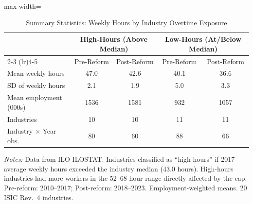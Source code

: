 \begin{table}[t]
\centering
\caption{Summary Statistics: Weekly Hours by Industry Overtime Exposure}
\label{tab:summary}
\begin{adjustbox}{max width=\textwidth}
\begin{tabular}{lcccc}
\hline\hline
 & \multicolumn{2}{c}{High-Hours (Above Median)} & \multicolumn{2}{c}{Low-Hours (At/Below Median)} \\
\cmidrule(lr){2-3} \cmidrule(lr){4-5}
 & Pre-Reform & Post-Reform & Pre-Reform & Post-Reform \\
\hline
Mean weekly hours & 47.0 & 42.6 & 40.1 & 36.6 \\
SD of weekly hours & 2.1 & 1.9 & 5.0 & 3.3 \\
Mean employment (000s) & 1536 & 1581 & 932 & 1057 \\
Industries & 10 & 10 & 11 & 11 \\
Industry $\times$ Year obs. & 80 & 60 & 88 & 66 \\
\hline\hline
\end{tabular}
\end{adjustbox}
\begin{tablenotes}
\small
\item \textit{Notes:} Data from ILO ILOSTAT. Industries classified as ``high-hours'' if 2017 average weekly hours exceeded the industry median (43.0 hours). High-hours industries had more workers in the 52--68 hour range directly affected by the cap. Pre-reform: 2010--2017; Post-reform: 2018--2023. Employment-weighted means. 20 ISIC Rev.~4 industries.
\end{tablenotes}
\end{table}
